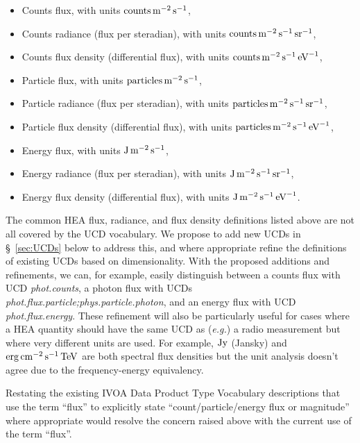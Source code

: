 \documentclass[11pt,a4paper]{ivoa}
\begin{document}
\begin{itemize}
\item Counts flux, with units $\rm\hbox{counts}\,m^{-2}\,s^{-1}$,
\item Counts radiance (flux per steradian), with units $\rm\hbox{counts}\,m^{-2}\,s^{-1}\,\hbox{sr}^{-1}$,
\item Counts flux density (differential flux), with units $\rm\hbox{counts}\,m^{-2}\,s^{-1}\,\hbox{eV}^{-1}$,
\item Particle flux, with units $\rm\hbox{particles}\,m^{-2}\,s^{-1}$,
\item Particle radiance (flux per steradian), with units $\rm\hbox{particles}\,m^{-2}\,s^{-1}\,\hbox{sr}^{-1}$,
\item Particle flux density (differential flux), with units $\rm\hbox{particles}\,m^{-2}\,s^{-1}\,\hbox{eV}^{-1}$,
\item Energy flux, with units $\rm J\,m^{-2}\,s^{-1}$,
\item Energy radiance (flux per steradian), with units $\rm J\,m^{-2}\,s^{-1}\,\hbox{sr}^{-1}$,
\item Energy flux density (differential flux), with units $\rm J\,m^{-2}\,s^{-1}\,\hbox{eV}^{-1}$.
\end{itemize}

The common \gls{HEA} flux, radiance, and flux density definitions listed above are not all covered by the UCD vocabulary.   We propose to add new UCDs in \S~\ref{sec:UCDs} below to address this, and where appropriate refine the definitions of existing UCDs based on dimensionality.  With the proposed additions and refinements, we can, for example, easily distinguish between a counts flux with UCD {\em phot.counts\/}, a photon flux with UCDs {\em phot.flux.particle;phys.particle.photon\/}, and an energy flux with UCD {\em phot.\-flux.energy\/}.  These refinement will also be particularly useful for cases where a \gls{HEA} quantity should have the same UCD as ({\em e.g.\/}\null) a radio measurement but where very different units are used. For example, $\rm Jy$ (Jansky) and $\rm erg\,cm^{-2}\,s^{-1}\,TeV$ are both spectral flux densities but the unit analysis doesn’t agree due to the frequency-energy equivalency.

Restating the existing IVOA Data Product Type Vocabulary descriptions that use the term ``flux'' to explicitly state ``count/particle/energy flux or magnitude'' where appropriate would resolve the concern raised above with the current use of the term ``flux''.
\end{document}
